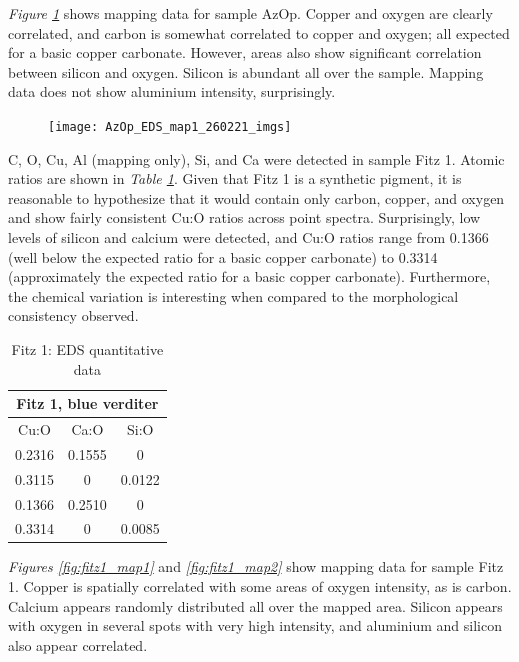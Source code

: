 \textit{Figure \ref{fig:azop_map1}} shows mapping data for sample AzOp. Copper and oxygen are clearly correlated, and carbon is somewhat correlated to copper and oxygen; all expected for a basic copper carbonate. However, areas also show significant correlation between silicon and oxygen. Silicon is abundant all over the sample. Mapping data does not show aluminium intensity, surprisingly. 

\begin{figure}[H]
\centering
  \texttt{[image: AzOp\_EDS\_map1\_260221\_imgs]}
\label{fig:azop_map1}
\end{figure}


C, O, Cu, Al (mapping only), Si, and Ca were detected in sample Fitz 1. Atomic ratios are shown in \textit{Table \ref{table:fitz1_ratios}}. Given that Fitz 1 is a synthetic pigment, it is reasonable to hypothesize that it would contain only carbon, copper, and oxygen and show fairly consistent Cu:O ratios across point spectra. Surprisingly, low levels of silicon and calcium were detected, and Cu:O ratios range from 0.1366 (well below the expected ratio for a basic copper carbonate) to 0.3314 (approximately the expected ratio for a basic copper carbonate). Furthermore, the chemical variation is interesting when compared to the morphological consistency observed.

\begin{table}[H]
\caption{Fitz 1: EDS quantitative data}
\centering
\label{table:fitz1_ratios}
\begin{tabular}{c c c}
\toprule
\multicolumn{3}{c}{Fitz 1, blue verditer} \\
\midrule
Cu:O & Ca:O & Si:O \\
\midrule
0.2316 & 0.1555 & 0 \\
0.3115 & 0 & 0.0122 \\
0.1366 & 0.2510 & 0 \\
0.3314 & 0 & 0.0085 \\
\bottomrule
\end{tabular}
\end{table}

\textit{Figures \ref{fig:fitz1_map1}} and \textit{\ref{fig:fitz1_map2}} show mapping data for sample Fitz 1. Copper is spatially correlated with some areas of oxygen intensity, as is carbon. Calcium appears randomly distributed all over the mapped area. Silicon appears with oxygen in several spots with very high intensity, and aluminium and silicon also appear correlated.

